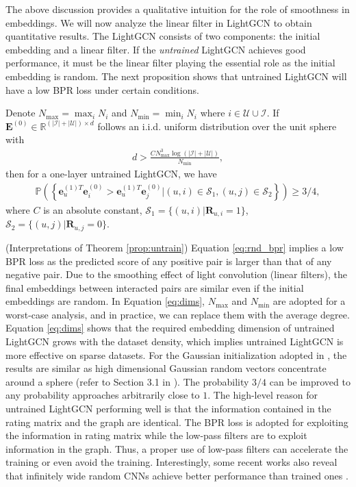 \documentclass[sigconf]{acmart}
\begin{document}
The above discussion provides a qualitative intuition for the role of smoothness in embeddings. We will now analyze the linear filter in LightGCN to obtain quantitative results. The LightGCN consists of two components: the initial embedding and a linear filter. If the \emph{untrained} LightGCN achieves good performance, it must be the linear filter playing the essential role as the initial embedding is random. The next proposition shows that untrained LightGCN will have a low BPR loss under certain conditions. 


\begin{theorem} \label{prop:untrain}
    Denote $N_{\max} = \max_i N_i$ and $N_{\min} = \min_i N_i$ where $i \in \mathcal{U} \cup \mathcal{I}$. If $\bm{E}^{(0)} \in \mathbb{R}^{(|\mathcal{I}| + |\mathcal{U}|) \times d}$ follows an i.i.d. uniform distribution over the unit sphere with
    \begin{align} \label{eq:dims}
        d > \frac{ C N_{\max}^{3} \log(|\mathcal{I}| + |\mathcal{U}|)}{N_{\min}},
    \end{align}
    then for a one-layer untrained LightGCN, we have
    \begin{align} \label{eq:rnd_bpr}
        \mathbb{P} \left(\left\{\bm{e}^{(1)T}_u \bm{e}^{(0)}_i   > \bm{e}_u^{(1)T} \bm{e}^{(0)}_j | (u,i) \in \mathcal{S}_1, (u,j) \in \mathcal{S}_2\right\} \right) \geq 3/4,
    \end{align}
    where $C$ is an absolute constant, $\mathcal{S}_1 = \{(u,i)|\bm{R}_{u,i}=1\}$, $\mathcal{S}_2 = \{(u,j)|\bm{R}_{u,j}=0\}$.
\end{theorem}

\begin{remark} (Interpretations of Theorem \ref{prop:untrain}) Equation \eqref{eq:rnd_bpr} implies a low BPR loss as the predicted score of any positive pair is larger than that of any negative pair. Due to the smoothing effect of light convolution (linear filters), the final embeddings between interacted pairs are similar even if the initial embeddings are random. In Equation \eqref{eq:dims}, $N_{\max}$ and $N_{\min}$ are adopted for a worst-case analysis, and in practice, we can replace them with the average degree. Equation \eqref{eq:dims} shows that the required embedding dimension of untrained LightGCN grows with the dataset density, which implies untrained LightGCN is more effective on sparse datasets. For the Gaussian initialization adopted in \cite{he2020lightgcn}, the results are similar as high dimensional Gaussian random vectors concentrate around a sphere (refer to Section 3.1 in \cite{vershynin2018high}). The probability $3/4$ can be improved to any probability approaches arbitrarily close to $1$. The high-level reason for untrained LightGCN performing well is that the information contained in the rating matrix and the graph are identical. The BPR loss is adopted for exploiting the information in rating matrix while the low-pass filters are to exploit information in the graph. Thus, a proper use of low-pass filters can accelerate the training or even avoid the training. Interestingly, some recent works also reveal that infinitely wide random CNNs achieve better performance than trained ones \cite{arora2019harnessing}.
\end{remark}
\end{document}
